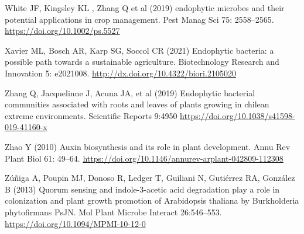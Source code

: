 \documentclass[sn-mathphys,Numbered]{sn-jnl}%
\theoremstyle{thmstyleone}%
\theoremstyle{thmstyletwo}%
\theoremstyle{thmstylethree}%
\begin{document}
White JF, Kingsley KL , Zhang Q et al (2019) endophytic microbes and their potential applications in crop management. Pest Manag Sci 75: 2558–2565. \url{https://doi.org/10.1002/ps.5527}

Xavier ML, Bosch AR, Karp SG, Soccol CR (2021) Endophytic bacteria: a possible path towards a sustainable agriculture. Biotechnology Research and Innovation 5: e2021008. \url{http://dx.doi.org/10.4322/biori.2105020}

Zhang Q, Jacquelinne J, Acuna JA, et al (2019) Endophytic bacterial communities associated with roots and leaves of plants growing in chilean extreme environments. Scientific Reports 9:4950 \url{https://doi.org/10.1038/s41598-019-41160-x}

Zhao Y (2010) Auxin biosynthesis and its role in plant development. Annu Rev Plant Biol 61: 49–64. \url{https://doi.org/10.1146/annurev-arplant-042809-112308}

Zúñiga A, Poupin MJ, Donoso R, Ledger T, Guiliani N, Gutiérrez RA, González B (2013) Quorum sensing and indole-3-acetic acid degradation play a role in colonization and plant growth promotion of Arabidopsis thaliana by Burkholderia phytofirmans PsJN. Mol Plant Microbe Interact 26:546–553. \url{https://doi.org/10.1094/MPMI-10-12-0}
\end{document}
